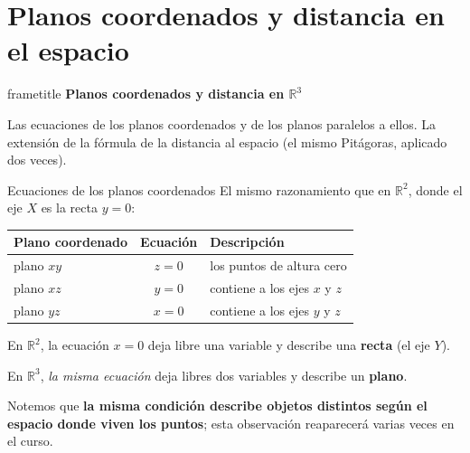 \documentclass[aspectratio=169,10pt]{beamer}
\newcommand{\destaca}[1]{%
  \par\vspace{3pt}\noindent
  \colorbox{turquesaClaro}{%
    \parbox{\dimexpr\linewidth-2\fboxsep\relax}{\vspace{3pt}#1\vspace{3pt}}}%
  \par\vspace{3pt}}
\newcommand{\hojaSesion}[2]{%
  \vfill
  \begin{beamercolorbox}[wd=\textwidth,sep=16pt,center]{frametitle}
    {\Large\bfseries #1}\\[11pt]
    \begin{minipage}{0.82\textwidth}\centering\small #2\end{minipage}
  \end{beamercolorbox}
  \vfill}
\begin{document}
\section{Planos coordenados y distancia en el espacio}
\begin{frame}[plain]
  \hojaSesion{Planos coordenados y distancia en $\mathbb{R}^3$}{%
  Las ecuaciones de los planos coordenados y de los planos paralelos
  a ellos. La extensión de la fórmula de la distancia  al espacio (el mismo Pitágoras, aplicado dos veces).}
\end{frame}
\begin{frame}{Ecuaciones de los planos coordenados}
  El mismo razonamiento que en $\mathbb{R}^2$, donde el eje $X$ es la
  recta $y=0$:

  \vspace{0.2cm}
  \begin{center}
  {\small
  \begin{tabular}{@{}lcl@{}}
    \toprule
    \textbf{Plano coordenado} & \textbf{Ecuación} & \textbf{Descripción} \\
    \midrule
    plano $xy$ & $z=0$ & los puntos de altura cero \\
    plano $xz$ & $y=0$ & contiene a los ejes $x$ y $z$ \\
    plano $yz$ & $x=0$ & contiene a los ejes $y$ y $z$ \\
    \bottomrule
  \end{tabular}}
  \end{center}

  \vspace{0.3cm}
  \destaca{En $\mathbb{R}^2$, la ecuación $x=0$ deja libre una
  variable y describe una \textbf{recta} (el eje $Y$).
  
  \vspace{0.15cm}
  En $\mathbb{R}^3$, \textit{la misma ecuación} deja libres dos variables y
  describe un \textbf{plano}. 
  
  \vspace{0.15cm}
  Notemos que \textbf{la misma condición describe objetos
  distintos según el espacio donde viven los puntos}; esta observación
  reaparecerá varias veces en el curso.}
\end{frame}
\end{document}
